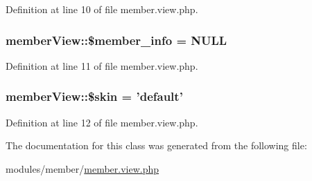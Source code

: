 Definition at line 10 of file member.\+view.\+php.

\hypertarget{classmemberView_a435c30d8223b51ac6b6a568142dc6c2e}{
\subsubsection[{\$member\+\_\+info}]{\setlength{\rightskip}{0pt plus 5cm}member\+View\+::\$member\+\_\+info = N\+U\+L\+L}}\label{classmemberView_a435c30d8223b51ac6b6a568142dc6c2e}


Definition at line 11 of file member.\+view.\+php.

\hypertarget{classmemberView_a01171d2b82e91a06754a9f8c52af6962}{
\subsubsection[{\$skin}]{\setlength{\rightskip}{0pt plus 5cm}member\+View\+::\$skin = 'default'}}\label{classmemberView_a01171d2b82e91a06754a9f8c52af6962}


Definition at line 12 of file member.\+view.\+php.



The documentation for this class was generated from the following file\+:\begin{DoxyCompactItemize}
\item 
modules/member/\hyperlink{member_8view_8php}{member.\+view.\+php}\end{DoxyCompactItemize}
